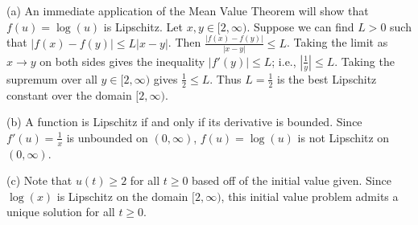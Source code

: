 \documentclass[10pt,oneside,openany]{memoir}
\begin{document}
    \begin{solution}
        (a) An immediate application of the Mean Value Theorem will show that $f(u) = \log(u)$ is Lipschitz. Let $x,y \in [2,\infty)$. Suppose we can find $L > 0$ such that $|f(x) - f(y)| \leq L|x-y|$. Then $\frac{|f(x) - f(y)|}{|x-y|} \leq L$. Taking the limit as $x \rightarrow y$ on both sides gives the inequality $|f'(y)| \leq L$; i.e., $|\frac{1}{y}| \leq L$. Taking the supremum over all $y \in [2,\infty)$ gives $\frac{1}{2} \leq L$. Thus $L = \frac{1}{2}$ is the best Lipschitz constant over the domain $[2,\infty)$.

        (b) A function is Lipschitz if and only if its derivative is bounded. Since $f'(u) = \frac{1}{x}$ is unbounded on $(0,\infty)$, $f(u) = \log(u)$ is not Lipschitz on $(0,\infty)$.

        (c) Note that $u(t) \geq 2$ for all $t \geq 0$ based off of the initial value given. Since $\log(x)$ is Lipschitz on the domain $[2,\infty)$, this initial value problem admits a unique solution for all $t \geq 0$.
    \end{solution}
\end{document}
